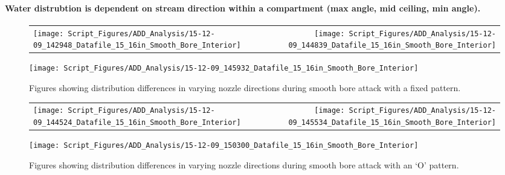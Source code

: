 \documentclass{article}
\begin{document}
\clearpage

\paragraph{Water distrubtion is dependent on stream direction within a compartment (max angle, mid ceiling, min angle).} \mbox{}



\begin{figure}[ht]
\begin{tabular*}{\textwidth}{lr}
\texttt{[image: Script\_Figures/ADD\_Analysis/15-12-09\_142948\_Datafile\_15\_16in\_Smooth\_Bore\_Interior]} &
\texttt{[image: Script\_Figures/ADD\_Analysis/15-12-09\_144839\_Datafile\_15\_16in\_Smooth\_Bore\_Interior]} \\
\end{tabular*}
\centering
\texttt{[image: Script\_Figures/ADD\_Analysis/15-12-09\_145932\_Datafile\_15\_16in\_Smooth\_Bore\_Interior]}
\caption{Figures showing distribution differences in varying nozzle directions during smooth bore attack with a fixed pattern.}
\label{fig:Interior_Varying_Nozzle_Direction_SB_Fixed_Pattern}
\end{figure}

\clearpage


\begin{figure}[ht]
\begin{tabular*}{\textwidth}{lr}
\texttt{[image: Script\_Figures/ADD\_Analysis/15-12-09\_144524\_Datafile\_15\_16in\_Smooth\_Bore\_Interior]} &
\texttt{[image: Script\_Figures/ADD\_Analysis/15-12-09\_145534\_Datafile\_15\_16in\_Smooth\_Bore\_Interior]} \\
\end{tabular*}
\centering
\texttt{[image: Script\_Figures/ADD\_Analysis/15-12-09\_150300\_Datafile\_15\_16in\_Smooth\_Bore\_Interior]}
\caption{Figures showing distribution differences in varying nozzle directions during smooth bore attack with an `O' pattern.}
\label{fig:Interior_Varying_Nozzle_Direction_SB_O_Pattern}
\end{figure}
\end{document}
